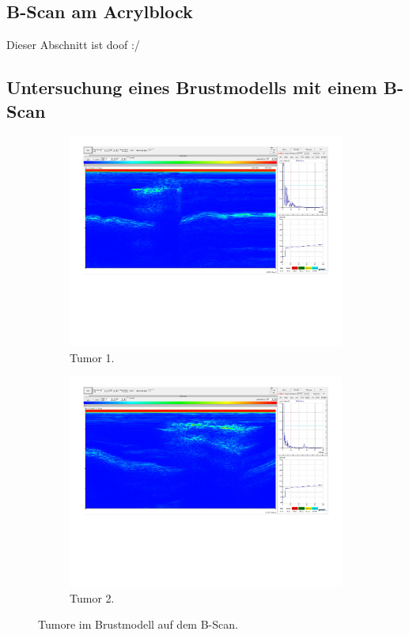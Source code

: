 \subsection{B-Scan am Acrylblock}

Dieser Abschnitt ist doof :/
   
\subsection{Untersuchung eines Brustmodells mit einem B-Scan}%
\begin{figure}%
    \begin{subfigure}{0.48\textwidth}%
        \centering%
        \includegraphics[width=\textwidth]{Messdaten/Tumor 1D.pdf}%
        \caption{Tumor 1.}%
        \label{fig:tumor_1}%
    \end{subfigure}%
    \begin{subfigure}{0.48\textwidth}%
        \centering%
        \includegraphics[width=\textwidth]{Messdaten/Tumor 2B.pdf}%
        \caption{Tumor 2.}%
        \label{fig:tumor_2}%
    \end{subfigure}%
    \caption{Tumore im Brustmodell auf dem B-Scan.}%
    \label{fig:tumore}
\end{figure}%

